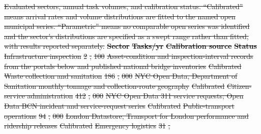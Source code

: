 \documentclass[utf8]{FrontiersinHarvard}
\providecommand{\DIFdel}[1]{{\protect\color{red}\sout{#1}}}                      %
\providecommand{\DIFdelFL}[1]{\DIFdel{#1}} %
\begin{document}
{%
\DIFdelFL{Evaluated sectors, annual task volumes, and calibration status. ``Calibrated'' means arrival rates and volume distributions are fitted to the named open municipal series. ``Parametric'' means no comparable open series was identified and the sector's distributions are specified as a swept range rather than fitted, with results reported separately.}}
\textbf{\DIFdelFL{Sector}} %
\textbf{\DIFdelFL{Tasks/yr}} %
\textbf{\DIFdelFL{Calibration source}} %
\textbf{\DIFdelFL{Status}}%
\DIFdelFL{Infrastructure inspection }%
\DIFdelFL{2}%
\DIFdelFL{,}%
\DIFdelFL{100 }%
\DIFdelFL{Asset-condition and inspection-interval records from the portals below and published national bridge inventories }%
\DIFdelFL{Calibrated}%
\DIFdelFL{Waste collection and sanitation }%
\DIFdelFL{186}%
\DIFdelFL{,}%
\DIFdelFL{000 }%
\DIFdelFL{NYC Open Data, Department of Sanitation monthly tonnage and collection-route geography }%
\DIFdelFL{Calibrated}%
\DIFdelFL{Citizen-service administration }%
\DIFdelFL{412}%
\DIFdelFL{,}%
\DIFdelFL{000 }%
\DIFdelFL{NYC Open Data 311 service requests; Open Data BCN incident and service-request series }%
\DIFdelFL{Calibrated}%
\DIFdelFL{Public-transport operations }%
\DIFdelFL{94}%
\DIFdelFL{,}%
\DIFdelFL{000 }%
\DIFdelFL{London Datastore, Transport for London performance and ridership releases }%
\DIFdelFL{Calibrated}%
\DIFdelFL{Emergency logistics }%
\DIFdelFL{31}%
\DIFdelFL{,}%
\end{document}
